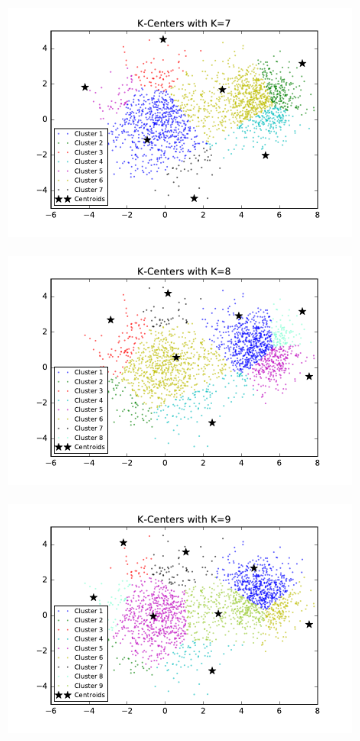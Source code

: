 \begin{description}
\begin{description}
\begin{figure}[!h]
\begin{subfigure}[b]{0.475\textwidth}
            \includegraphics[width=\textwidth]{./figures/clustering_kCenter_7.pdf}
        \end{subfigure}
        \hfill
        \begin{subfigure}[b]{0.475\textwidth}  
            \centering 
            \includegraphics[width=\textwidth]{./figures/clustering_kCenter_8.pdf}
        \end{subfigure}
        \begin{subfigure}[b]{0.475\textwidth}   
            \centering 
            \includegraphics[width=\textwidth]{./figures/clustering_kCenter_9.pdf}

\end{subfigure}
\end{figure}
\end{description}
\end{description}
